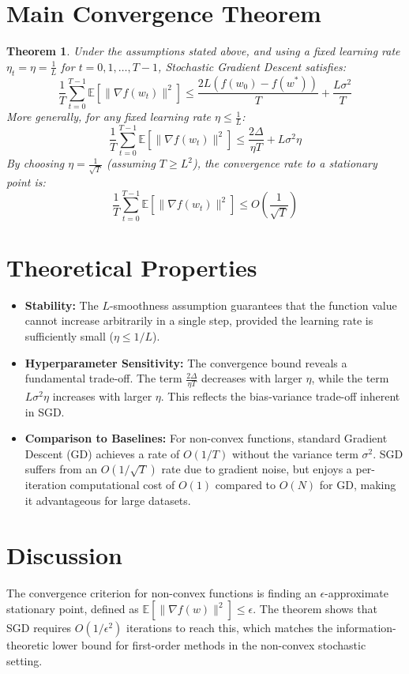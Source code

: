 \documentclass{article}
\newtheorem{theorem}{Theorem}
\begin{document}
\section*{Main Convergence Theorem}
\begin{theorem}
Under the assumptions stated above, and using a fixed learning rate $\eta_t = \eta = \frac{1}{L}$ for $t = 0, 1, \dots, T-1$, Stochastic Gradient Descent satisfies:
$$\frac{1}{T} \sum_{t=0}^{T-1} \mathbb{E}[\|\nabla f(w_t)\|^2] \leq \frac{2L(f(w_0) - f(w^*))}{T} + \frac{L\sigma^2}{T}$$
More generally, for any fixed learning rate $\eta \leq \frac{1}{L}$:
$$\frac{1}{T} \sum_{t=0}^{T-1} \mathbb{E}[\|\nabla f(w_t)\|^2] \leq \frac{2\Delta}{\eta T} + L\sigma^2 \eta$$
By choosing $\eta = \frac{1}{\sqrt{T}}$ (assuming $T \geq L^2$), the convergence rate to a stationary point is:
$$\frac{1}{T} \sum_{t=0}^{T-1} \mathbb{E}[\|\nabla f(w_t)\|^2] \leq O\left(\frac{1}{\sqrt{T}}\right)$$
\end{theorem}

\section*{Theoretical Properties}
\begin{itemize}
    \item \textbf{Stability:} The $L$-smoothness assumption guarantees that the function value cannot increase arbitrarily in a single step, provided the learning rate is sufficiently small ($\eta \leq 1/L$).
    \item \textbf{Hyperparameter Sensitivity:} The convergence bound reveals a fundamental trade-off. The term $\frac{2\Delta}{\eta T}$ decreases with larger $\eta$, while the term $L\sigma^2 \eta$ increases with larger $\eta$. This reflects the bias-variance trade-off inherent in SGD.
    \item \textbf{Comparison to Baselines:} For non-convex functions, standard Gradient Descent (GD) achieves a rate of $O(1/T)$ without the variance term $\sigma^2$. SGD suffers from an $O(1/\sqrt{T})$ rate due to gradient noise, but enjoys a per-iteration computational cost of $O(1)$ compared to $O(N)$ for GD, making it advantageous for large datasets.
\end{itemize}

\section*{Discussion}
The convergence criterion for non-convex functions is finding an $\epsilon$-approximate stationary point, defined as $\mathbb{E}[\|\nabla f(w)\|^2] \leq \epsilon$. The theorem shows that SGD requires $O(1/\epsilon^2)$ iterations to reach this, which matches the information-theoretic lower bound for first-order methods in the non-convex stochastic setting.
\end{document}
